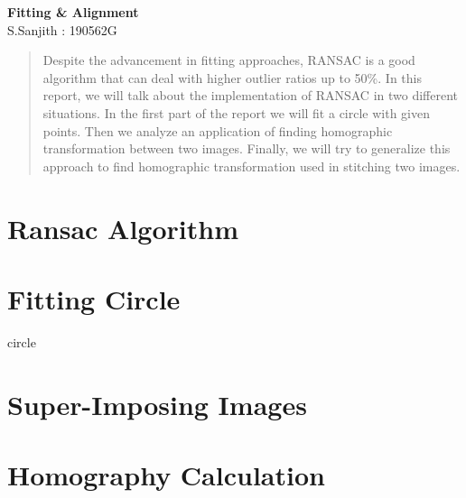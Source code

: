 \documentclass{article}
\begin{document}
\begin{center} 
    {\Large \textbf{Fitting \& Alignment}}\\\vspace*{.1cm}
    S.Sanjith : 190562G
\end{center}
\vspace*{-.5cm}
\HRule
\begin{abstract}
    Despite the advancement in fitting approaches, RANSAC  is a good algorithm that can deal with higher outlier ratios up to 50\%.    In this report, we will talk about the implementation of RANSAC in two different situations. In the first part of the report we will fit a circle with given points. Then we analyze an application of finding homographic transformation between two images. Finally, we will try to generalize this approach to find homographic transformation used in stitching two images.
\end{abstract}


\section{Ransac Algorithm}
\section{Fitting Circle}
{circle}
\section{Super-Imposing Images}
\section{Homography Calculation}
\end{document}

